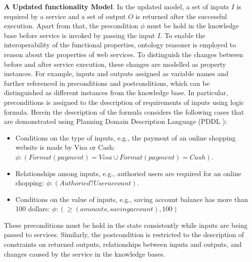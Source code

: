 \textbf{A Updated functionality Model}. In the updated model, a set of inputs $I$ is required by a service and a set of output $O$ is returned after the successful execution. Apart from that, the precondition $\phi$ must be hold in the knowledge base before service is invoked by passing the input $I$. To enable the interoperability of the functional properties, ontology reasoner is employed to reason about the properties of web services. To distinguish the changes between before and after service execution, these changes are modelled as property instances. For example, inputs and outputs assigned as variable names and further referenced in preconditions and postconditions, which can be distinguished as different instances from the knowledge base. In particular, preconditions is assigned to the description of requirements of inputs using logic formula. Herein the description of the formula considers the following cases that are demonstrated using Planning Domain Description Language (PDDL \cite{fox2003pddl2}):
\begin{itemize}
\item Conditions on the type of inputs, e.g., the payment of an online shopping website is made by Visa or Cash: $\phi:(Format(payment)=Visa \cup Format(payment)=Cash)$.
\item Relationships among inputs, e.g.,  authoried users are required for an online shopping: $\phi:(Authoried ? Useraccount)$.
\item Conditions on the value of inputs, e.g., saving account balance has more than 100 dollars: $\phi: (\geq (amounts, saving account), 100)$
\end{itemize}
These preconditions must be hold in the state consistently while inputs are being passed to services. Similarly, the postcondition is restricted to the description of constraints on returned outputs, relationships between inputs and outputs, and changes caused by the service in the knowledge bases.

